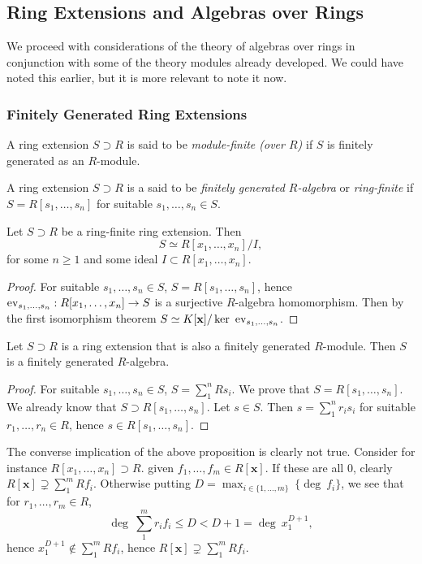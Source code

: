 \subsection{Ring Extensions and Algebras over Rings}
We proceed with considerations of the theory of algebras over rings in conjunction with some of the theory modules already developed. We could have noted this earlier, but it is more relevant to note it now. 
\subsubsection{Finitely Generated Ring Extensions}
\begin{definition}
    A ring extension $S\supset R$ is said to be \textit{module-finite (over $R$)} if $S$ is finitely generated as an $R$-module.
\end{definition}
\begin{definition}
    A ring extension $S\supset R$ is a said to be \textit{finitely generated $R$-algebra} or \textit{ring-finite} if $S=R[s_1,\dots,s_n]$ for suitable $s_1,\dots,s_n\in S$.
\end{definition}
\begin{proposition}\label{FinitelyGeneratedAlgebrasArePolynomialQuotientRings}
    Let $S\supset R$ be a ring-finite ring extension. Then
    $$S\simeq R[x_1,\dots,x_n]/I,$$
    for some $n\geq 1$ and some ideal $I\subset R[x_1,\dots,x_n]$.
\end{proposition}
\begin{proof}
    For suitable $s_1,\dots,s_n\in S$, $S=R[s_1,\dots,s_n]$, hence $\mathrm{ev}_{s_1,\dots,s_n} : R[x_1,\dots,x_n]\rightarrow S$ is a surjective $R$-algebra homomorphism. Then by the first isomorphism theorem $S\simeq K[\mathbf{x}]/\ker \ \ev_{s_1,\dots,s_n}$. 
\end{proof}
\begin{proposition}\label{ModuleFiniteImpliesRingFinite}
    Let $S\supset R$ is a ring extension that is also a finitely generated $R$-module. Then $S$ is a finitely generated $R$-algebra.
\end{proposition}
\begin{proof}
    For suitable $s_1,\dots,s_n\in S$, $S = \sum_1^n Rs_i$. We prove that $S = R[s_1,\dots,s_n]$. We already know that $S\supset R[s_1,\dots,s_n]$. Let $s\in S$. Then $s = \sum_1^n r_is_i$ for suitable $r_1,\dots,r_n \in R$, hence $s\in R[s_1,\dots,s_n]$. 
\end{proof}
\begin{example}
    The converse implication of the above proposition is clearly not true. Consider for instance $R[x_1,\dots,x_n]\supset R$. given $f_1,\dots,f_m\in R[\mathbf{x}]$. If these are all $0$, clearly $R[\mathbf{x}]\supsetneq \sum_1^m Rf_i$. Otherwise putting $D = \max_{i\in\{1,\dots,m\}}\ \{\deg\ f_i \}$, we see that for $r_1,\dots, r_m\in R$, 
    $$\deg \ \sum_1^m r_if_i \leq D < D+1 = \deg \ x_1^{D+1},$$
    hence $x_1^{D+1}\notin \sum_1^m Rf_i$, hence $R[\mathbf{x}]\supsetneq \sum_1^m Rf_i.$
\end{example}
